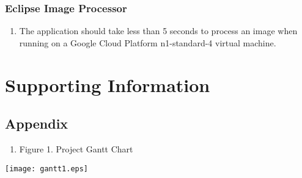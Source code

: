 \documentclass[10pt, onecolumn, draftclsnofoot, letterpaper, compsoc]{IEEEtran}
\begin{document}
\subsubsection{Eclipse Image Processor}
	\begin{enumerate}
		\item The application should take less than 5 seconds to process an
		 image when running on a Google Cloud Platform n1-standard-4 virtual
		 machine.
	\end{enumerate}

\newpage
\section{Supporting Information}

\subsection{Appendix}

\begin{enumerate}
	\item Figure 1. Project Gantt Chart 
\end{enumerate}

\begin{center}
	\texttt{[image: gantt1.eps]}
\end{center}
\end{document}
